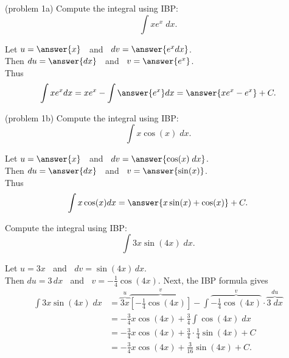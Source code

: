 \documentclass{ximera}
\begin{document}
\begin{problem}(problem 1a) %
  Compute the integral using IBP:
  \[
  \int xe^x \;dx.
  \]
  
  Let $u = \answer{x}\;\;$   and   $\;\; dv = \answer{e^x dx}$.\\
  Then $du = \answer{dx}\;\;$   and   $\;\; v = \answer{e^x}$.\\
  Thus 
  \[
  \int xe^x dx = xe^x - \int \answer{e^x} dx = \answer{xe^x - e^x} + C.
  \]
  


    

\end{problem}


\begin{problem}(problem 1b)
  Compute the integral using IBP:
  \[
  \int x\cos(x) \;dx.
  \]
  
  Let $u = \answer{x}\;\;$   and   $\;\;dv = \answer{\cos(x) \;dx}$.\\
  Then $du = \answer{dx}\;\;$   and   $\;\;v = \answer{\sin(x)}$.\\
  Thus 
  \[
  \int x\cos(x) dx = \answer{x\sin(x) + \cos(x)} + C.
  \]
  
  


    

\end{problem}


\begin{example}[example 2]
Compute the integral using IBP:
  \[
  \int 3x\sin(4x) \;dx.
  \]

Let $u = 3x\;\;$ and $\;\;dv = \sin(4x) \,dx$.\\
Then $du = 3 \,dx\;\;$ and $\;\; v = -\frac14 \cos(4x)$.
Next, the IBP formula gives
\begin{align*}
  \int 3x\sin(4x) \;dx &= \overbrace{3x}^{u}\overbrace{\left[-\frac14 \cos(4x)\right]}^{v} - \int \overbrace{-\frac14 \cos(4x)}^{v}  \cdot \overbrace{3 \; dx}^{du} \\
                       &= -\frac34 x\cos(4x) + \frac34 \int \cos(4x) \; dx \\
                       &= -\frac34 x\cos(4x) + \frac34 \cdot \frac 14 \sin(4x) + C\\
                       &= -\frac34 x\cos(4x) + \frac{3}{16}\sin(4x) + C.
\end{align*}

\end{example}
\end{document}
